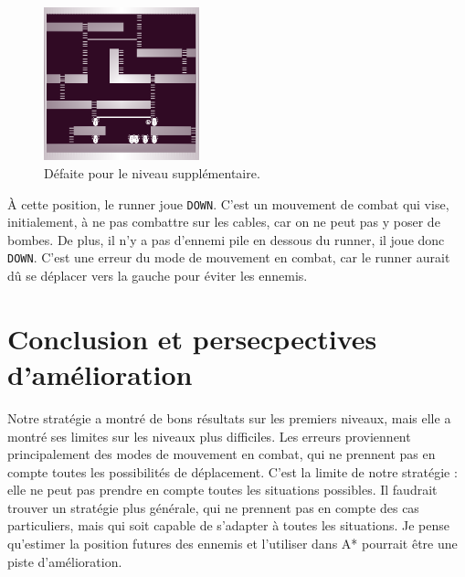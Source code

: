 \begin{figure}[!htpb]
    \centering
    \includegraphics[width=0.4\textwidth]{Figures/level5-over.png}
    \caption{Défaite pour le niveau supplémentaire.}
    \label{fig:defaite-niveau-supplementaire}
\end{figure}

À cette position, le runner joue \texttt{DOWN}.
C'est un mouvement de combat qui vise, initialement, à ne pas combattre sur les cables, car on ne peut pas y poser de bombes.
De plus, il n'y a pas d'ennemi pile en dessous du runner, il joue donc \texttt{DOWN}.
\newline
C'est une erreur du mode de mouvement en combat, car le runner aurait dû se déplacer vers la gauche pour éviter les ennemis.

\section{Conclusion et persecpectives d'amélioration}

Notre stratégie a montré de bons résultats sur les premiers niveaux, mais elle a montré ses limites sur les niveaux plus difficiles.
\newline
Les erreurs proviennent principalement des modes de mouvement en combat, qui ne prennent pas en compte toutes les possibilités de déplacement.
\newline
C'est la limite de notre stratégie : elle ne peut pas prendre en compte toutes les situations possibles.
Il faudrait trouver un stratégie plus générale, qui ne prennent pas en compte des cas particuliers, mais qui soit capable de s'adapter à toutes les situations.
\newline
Je pense qu'estimer la position futures des ennemis et l'utiliser dans A* pourrait être une piste d'amélioration.